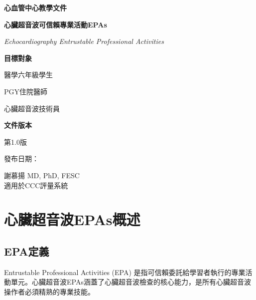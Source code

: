 \documentclass[12pt,a4paper]{article}
\newcommand{\mydate}{\DTMtoday}
\begin{document}
\begin{titlepage}
    \centering
    {\LARGE\textcolor{emergency_red}{\textbf{心血管中心教學文件}}\par}
    \vspace{1cm}
    {\huge\bfseries 心臟超音波可信賴專業活動EPAs\par}
    \vspace{0.5cm}
    {\Large\textcolor{emergency_blue}{\textit{Echocardiography Entrustable Professional Activities}}\par}
    \vspace{1cm}
    
    \begin{tcolorbox}[
        colback=emergency_blue!5!white,
        colframe=emergency_blue,
        width=0.8\textwidth,
        arc=10pt,
        boxrule=1pt
    ]
    \centering
    {\large\textbf{目標對象}\par}
    \vspace{0.3cm}
    醫學六年級學生\par
    PGY住院醫師\par
    心臟超音波技術員\par
    \vspace{0.5cm}
    {\large\textbf{文件版本}\par}
    \vspace{0.3cm}
    第1.0版\par
    發布日期：\mydate\par
    \end{tcolorbox}

    \vfill
    
    {\large 謝慕揚 MD, PhD, FESC\\
    適用於CCC評量系統\par}
    
    \vspace{0.5cm}
\end{titlepage}

\newpage
\tableofcontents
\newpage

\section{心臟超音波EPAs概述}

\subsection{EPA定義}
Entrustable Professional Activities (EPA) 是指可信賴委託給學習者執行的專業活動單元。心臟超音波EPAs涵蓋了心臟超音波檢查的核心能力，是所有心臟超音波操作者必須精熟的專業技能。
\end{document}
